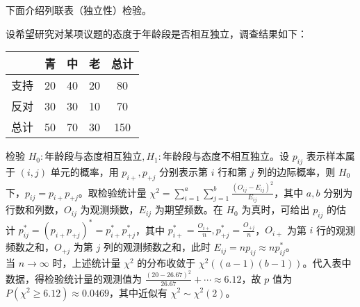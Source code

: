 \documentclass[../main.tex]{subfiles}
\begin{document}
下面介绍列联表（独立性）检验。

\begin{example}
    设希望研究对某项议题的态度于年龄段是否相互独立，调查结果如下：

    \bigskip
    \begin{tabular}{|c|c|c|c|c|}
        \hline
             & 青 & 中 & 老 & 总计 \\
        \hline
        支持 & 20 & 40 & 20 & 80   \\
        \hline
        反对 & 30 & 30 & 10 & 70   \\
        \hline
        总计 & 50 & 70 & 30 & 150  \\
        \hline
    \end{tabular}
    \bigskip

    \noindent 检验 $H_0:\text{年龄段与态度相互独立},H_1:\text{年龄段与态度不相互独立}$。设 $p_{ij}$ 表示样本属于 $(i,j)$ 单元的概率，用 $p_{i+},p_{+j}$ 分别表示第 $i$ 行和第 $j$ 列的边际概率，则 $H_0$ 下，$p_{ij}=p_{i+}p_{+j}$。取检验统计量 $\chi^2=\sum_{i=1}^a\sum_{j=1}^b\frac{(O_{ij}-E_{ij})^2}{E_{ij}}$，其中 $a,b$ 分别为行数和列数，$O_{ij}$ 为观测频数，$E_{ij}$ 为期望频数。在 $H_0$ 为真时，可给出 $p_{ij}$ 的估计 $p_{ij}^*=(p_{i+}p_{+j})^*=p_{i+}^*p_{+j}^*$，其中 $p_{i+}^*=\frac{O_{i+}}n,p_{+j}^*=\frac{O_{+j}}n$，$O_{i+}$ 为第 $i$ 行的观测频数之和，$O_{+j}$ 为第 $j$ 列的观测频数之和，此时 $E_{ij}=np_{ij}\approx np_{ij}^*$。\\
    当 $n\rightarrow\infty$ 时，上述统计量 $\chi^2$ 的分布收敛于 $\chi^2((a-1)(b-1))$。代入表中数据，得检验统计量的观测值为 $\frac{(20-26.67)^2}{26.67}+\cdots\approx6.12$，故 $p$ 值为 $P(\chi^2\geq6.12)\approx0.0469$，其中近似有 $\chi^2\sim\chi^2(2)$。
\end{example}
\end{document}
